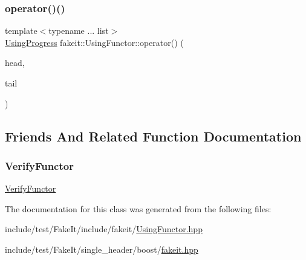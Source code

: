 \subsubsection{\texorpdfstring{operator()()}{operator()()}\hspace{0.1cm}{\footnotesize\ttfamily [9/9]}}
{\footnotesize\ttfamily template$<$typename ... list$>$ \\
\mbox{\hyperlink{classfakeit_1_1UsingProgress}{Using\+Progress}} fakeit\+::\+Using\+Functor\+::operator() (\begin{DoxyParamCaption}\item[{const \mbox{\hyperlink{structfakeit_1_1ActualInvocationsSource}{Actual\+Invocations\+Source}} \&}]{head,  }\item[{const list \&...}]{tail }\end{DoxyParamCaption})\hspace{0.3cm}{\ttfamily [inline]}}



\subsection{Friends And Related Function Documentation}
\mbox{\label{classfakeit_1_1UsingFunctor_a2a01b098d4a5791a5a03c1a440b1f20a}} 
\subsubsection{\texorpdfstring{VerifyFunctor}{VerifyFunctor}}
{\footnotesize\ttfamily \mbox{\hyperlink{classfakeit_1_1VerifyFunctor}{Verify\+Functor}}\hspace{0.3cm}{\ttfamily [friend]}}



The documentation for this class was generated from the following files\+:\begin{DoxyCompactItemize}
\item 
include/test/\+Fake\+It/include/fakeit/\mbox{\hyperlink{UsingFunctor_8hpp}{Using\+Functor.\+hpp}}\item 
include/test/\+Fake\+It/single\+\_\+header/boost/\mbox{\hyperlink{single__header_2boost_2fakeit_8hpp}{fakeit.\+hpp}}\end{DoxyCompactItemize}
